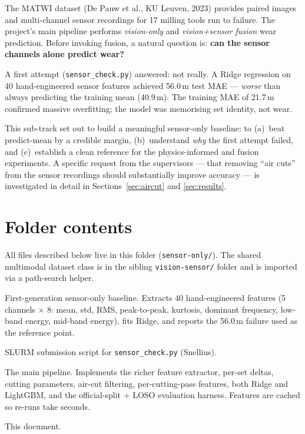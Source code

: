 \documentclass[11pt,a4paper]{article}
\newcommand{\code}[1]{\texttt{#1}}
\newcommand{\um}{\,\textmu m}
\begin{document}
The MATWI dataset (De Pauw et al., KU Leuven, 2023) provides paired images and
multi-channel sensor recordings for 17 milling tools run to failure. The
project's main pipeline performs \emph{vision-only} and \emph{vision+sensor
fusion} wear prediction. Before invoking fusion, a natural question is:
\textbf{can the sensor channels alone predict wear?}

A first attempt (\code{sensor\_check.py}) answered: not really. A Ridge
regression on 40 hand-engineered sensor features achieved 56.0\um{} test MAE
--- \emph{worse} than always predicting the training mean (40.9\um). The
training MAE of 21.7\um{} confirmed massive overfitting; the model was
memorising set identity, not wear.

This sub-track set out to build a meaningful sensor-only baseline: to (a)~beat
predict-mean by a credible margin, (b)~understand \emph{why} the first attempt
failed, and (c)~establish a clean reference for the physics-informed and fusion
experiments. A specific request from the supervisors --- that removing
``air cuts'' from the sensor recordings should substantially improve accuracy
--- is investigated in detail in Sections~\ref{sec:aircut} and \ref{sec:results}.

\section{Folder contents}

All files described below live in this folder (\code{sensor-only/}). The shared
multimodal dataset class is in the sibling \code{vision-sensor/} folder and is
imported via a path-search helper.

\begin{description}[style=nextline,labelindent=0pt,leftmargin=2em]
\item[\code{sensor\_check.py}]
    First-generation sensor-only baseline. Extracts 40 hand-engineered features
    (5 channels $\times$ 8: mean, std, RMS, peak-to-peak, kurtosis, dominant
    frequency, low-band energy, mid-band energy), fits Ridge, and reports the
    56.0\um{} failure used as the reference point.
\item[\code{sensor\_check.sh}]
    SLURM submission script for \code{sensor\_check.py} (Snellius).
\item[\code{sensor\_only\_v2.py}]
    The main pipeline. Implements the richer feature extractor, per-set deltas,
    cutting parameters, air-cut filtering, per-cutting-pass features, both Ridge
    and LightGBM, and the official-split + LOSO evaluation harness. Features are
    cached so re-runs take seconds.
\item[\code{sensor\_only\_report.tex}]
    This document.
\end{description}
\end{document}

